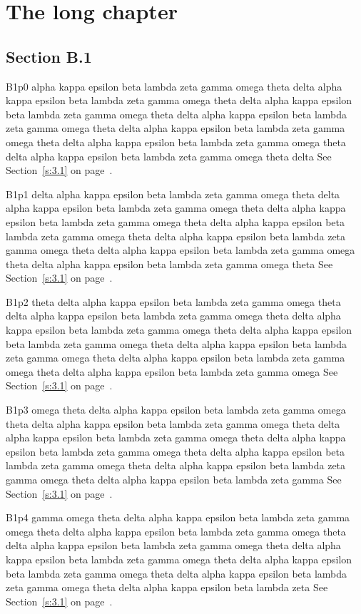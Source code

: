 \chapter{The long chapter}\label{ch:big}
\section{Section B.1}\label{s:B.1}
B1p0 alpha kappa epsilon beta lambda zeta gamma omega theta delta alpha kappa epsilon beta lambda zeta gamma omega theta delta alpha kappa epsilon beta lambda zeta gamma omega theta delta alpha kappa epsilon beta lambda zeta gamma omega theta delta alpha kappa epsilon beta lambda zeta gamma omega theta delta alpha kappa epsilon beta lambda zeta gamma omega theta delta alpha kappa epsilon beta lambda zeta gamma omega theta delta See Section~\ref{s:3.1} on page~\pageref{s:3.1}.

B1p1 delta alpha kappa epsilon beta lambda zeta gamma omega theta delta alpha kappa epsilon beta lambda zeta gamma omega theta delta alpha kappa epsilon beta lambda zeta gamma omega theta delta alpha kappa epsilon beta lambda zeta gamma omega theta delta alpha kappa epsilon beta lambda zeta gamma omega theta delta alpha kappa epsilon beta lambda zeta gamma omega theta delta alpha kappa epsilon beta lambda zeta gamma omega theta See Section~\ref{s:3.1} on page~\pageref{s:3.1}.

B1p2 theta delta alpha kappa epsilon beta lambda zeta gamma omega theta delta alpha kappa epsilon beta lambda zeta gamma omega theta delta alpha kappa epsilon beta lambda zeta gamma omega theta delta alpha kappa epsilon beta lambda zeta gamma omega theta delta alpha kappa epsilon beta lambda zeta gamma omega theta delta alpha kappa epsilon beta lambda zeta gamma omega theta delta alpha kappa epsilon beta lambda zeta gamma omega See Section~\ref{s:3.1} on page~\pageref{s:3.1}.

B1p3 omega theta delta alpha kappa epsilon beta lambda zeta gamma omega theta delta alpha kappa epsilon beta lambda zeta gamma omega theta delta alpha kappa epsilon beta lambda zeta gamma omega theta delta alpha kappa epsilon beta lambda zeta gamma omega theta delta alpha kappa epsilon beta lambda zeta gamma omega theta delta alpha kappa epsilon beta lambda zeta gamma omega theta delta alpha kappa epsilon beta lambda zeta gamma See Section~\ref{s:3.1} on page~\pageref{s:3.1}.

B1p4 gamma omega theta delta alpha kappa epsilon beta lambda zeta gamma omega theta delta alpha kappa epsilon beta lambda zeta gamma omega theta delta alpha kappa epsilon beta lambda zeta gamma omega theta delta alpha kappa epsilon beta lambda zeta gamma omega theta delta alpha kappa epsilon beta lambda zeta gamma omega theta delta alpha kappa epsilon beta lambda zeta gamma omega theta delta alpha kappa epsilon beta lambda zeta See Section~\ref{s:3.1} on page~\pageref{s:3.1}.

